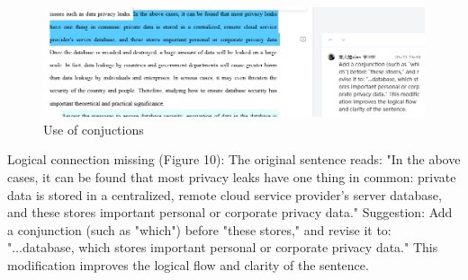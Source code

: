 \documentclass[sigconf]{acmart}
\begin{document}
\begin{figure}[h]
  \centering
  \includegraphics[width=\linewidth]{./picture/conjuction_1.png}
  \caption{Use of conjuctions}
\end{figure}

Logical connection missing (Figure 10): The original sentence reads: 
"In the above cases, it can be found that most privacy leaks have one thing in common: 
private data is stored in a centralized, remote cloud service provider's server database, 
and these stores important personal or corporate privacy data." 
Suggestion: Add a conjunction (such as "which") before "these stores," 
and revise it to: "...database, which stores important personal or corporate privacy data." 
This modification improves the logical flow and clarity of the sentence.






\end{document}
